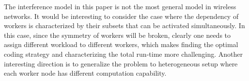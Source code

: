 \documentclass[onecolumn,journal,twoside]{IEEEtran}
\begin{document}
The interference model in this paper is not the most general model in wireless networks. It would be interesting to consider the case where the dependency of workers is characterized by their subsets that can be activated simultaneously. In this case, since the symmetry of workers will be broken, clearly one needs to assign different workload to different workers, which makes finding the optimal coding strategy and characterizing the total run-time more challenging. Another interesting direction is to generalize the problem to heterogeneous setup where each worker node has different computation capability.





\end{document}
